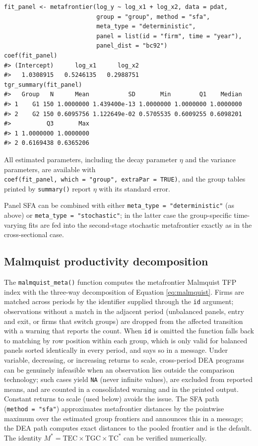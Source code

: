 \begin{verbatim}
fit_panel <- metafrontier(log_y ~ log_x1 + log_x2, data = pdat,
                          group = "group", method = "sfa",
                          meta_type = "deterministic",
                          panel = list(id = "firm", time = "year"),
                          panel_dist = "bc92")
coef(fit_panel)
#> (Intercept)      log_x1      log_x2 
#>   1.0308915   0.5246135   0.2988751
tgr_summary(fit_panel)
#>   Group   N      Mean           SD       Min        Q1    Median
#> 1    G1 150 1.0000000 1.439400e-13 1.0000000 1.0000000 1.0000000
#> 2    G2 150 0.6095756 1.122649e-02 0.5705535 0.6009255 0.6098201
#>          Q3       Max
#> 1 1.0000000 1.0000000
#> 2 0.6169438 0.6365206
\end{verbatim}

All estimated parameters, including the decay parameter \(\eta\) and the
variance parameters, are available with
\texttt{coef(fit\_panel,\ which\ =\ "group",\ extraPar\ =\ TRUE)}, and the group tables
printed by \texttt{summary()} report \(\eta\) with its standard error.

Panel SFA can be combined with either \texttt{meta\_type\ =\ "deterministic"} (as
above) or \texttt{meta\_type\ =\ "stochastic"}; in the latter case the group-specific
time-varying fits are fed into the second-stage stochastic metafrontier
exactly as in the cross-sectional case.

\subsection{Malmquist productivity decomposition}\label{sec:malmquist-usage}

The \texttt{malmquist\_meta()} function computes the metafrontier Malmquist TFP index
with the three-way decomposition of Equation \eqref{eq:malmquist}. Firms are matched
across periods by the identifier supplied through the \texttt{id} argument;
observations without a match in the adjacent period (unbalanced panels,
entry and exit, or firms that switch groups) are dropped from the affected
transition with a warning that reports the count. When \texttt{id} is omitted the
function falls back to matching by row position within each group, which is
only valid for balanced panels sorted identically in every period, and says
so in a message. Under variable, decreasing, or increasing returns to
scale, cross-period DEA programs can be genuinely infeasible when an
observation lies outside the comparison technology; such cases yield \texttt{NA}
(never infinite values), are excluded from reported means, and are counted
in a consolidated warning and in the printed output. Constant returns to
scale (used below) avoids the issue. The SFA path (\texttt{method\ =\ "sfa"})
approximates metafrontier distances by the pointwise maximum over the
estimated group frontiers and announces this in a message; the DEA path
computes exact distances to the pooled frontier and is the default. The
identity \(M^* = \text{TEC} \times \text{TGC} \times \text{TC}^*\) can be
verified numerically.

